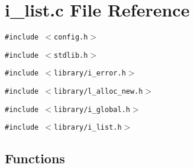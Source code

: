\section{i\_\-list.c File Reference}
\label{i__list_8c}
{\tt \#include $<$config.h$>$}\par
{\tt \#include $<$stdlib.h$>$}\par
{\tt \#include $<$library/i\_\-error.h$>$}\par
{\tt \#include $<$library/l\_\-alloc\_\-new.h$>$}\par
{\tt \#include $<$library/i\_\-global.h$>$}\par
{\tt \#include $<$library/i\_\-list.h$>$}\par
\subsection*{Functions}
